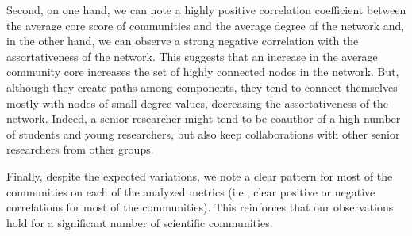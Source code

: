 Second, on one hand, we can note a highly positive correlation coefficient between the average core score of communities and the average degree of the network and, in the
other hand, we can 
observe a strong negative correlation with the assortativeness of the network. This suggests that an increase in the average community core increases the set of highly connected
nodes in the network. But, although they create paths among components, they tend to connect themselves mostly with nodes of small degree values, decreasing the assortativeness of the
network. Indeed, a senior researcher might tend to be coauthor of a high number of students and young researchers, but also keep collaborations with other senior researchers from
other groups.

Finally, despite the expected variations, we note a clear pattern for most of the communities on each of the analyzed metrics (i.e., clear positive or negative correlations for most of the
communities). This reinforces that our observations hold for a significant number of scientific communities. 





